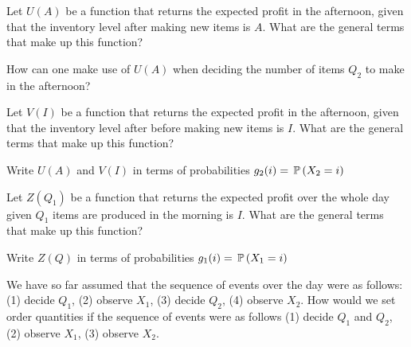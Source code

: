 \begin{exercise}
Let $U(A)$ be a function that returns the expected profit in the afternoon, given that the inventory level after making new items is $A$. What are the general terms that make up this function?
   \begin{comment}
     TBD.
   \end{comment}
\end{exercise}

\begin{exercise}
How can one make use of $U(A)$ when deciding the number of items $Q_2$ to make in the afternoon?
   \begin{comment}
     TBD.
   \end{comment}
\end{exercise}

\begin{exercise}
Let $V(I)$ be a function that returns the expected profit in the afternoon, given that the inventory level after before making new items is $I$. What are the general terms that make up this function?
   \begin{comment}
     TBD.
   \end{comment}
\end{exercise}

\begin{exercise}
Write $U(A)$ and $V(I)$ in terms of probabilities $g_2(i)=\P(X_2=i)$
   \begin{comment}
     TBD.
   \end{comment}
\end{exercise}

\begin{exercise}
Let $Z(Q_1)$ be a function that returns the expected profit over the whole day given $Q_1$ items are produced in the morning is $I$. What are the general terms that make up this function?
   \begin{comment}
     TBD.
   \end{comment}
\end{exercise}

\begin{exercise}
Write $Z(Q)$ in terms of probabilities $g_1(i)=\P(X_1=i)$
   \begin{comment}
     TBD.
   \end{comment}
\end{exercise}

\begin{exercise}
We have so far assumed that the sequence of events over the day were as follows: (1) decide $Q_1$, (2) observe $X_1$, (3) decide $Q_2$, (4) observe $X_2$. How would we set order quantities if the sequence of events were as follows (1) decide $Q_1$ and $Q_2$, (2) observe $X_1$, (3) observe $X_2$.
   \begin{comment}
     TBD.
   \end{comment}
\end{exercise}

